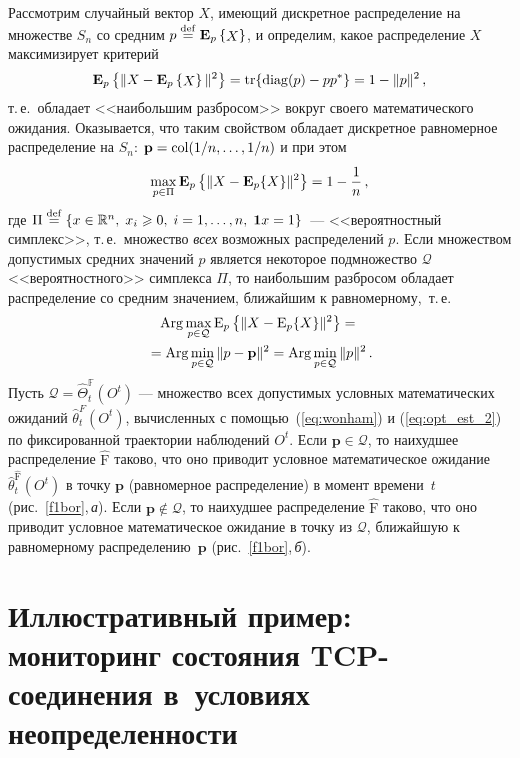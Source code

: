 \begin{multicols}{2}
 Рассмотрим случайный вектор $X$, имеющий дискретное распределение
 на множестве $S_n$ со средним $p \stackrel{\mathrm {def}}{=} \mathbf{E}_{ p }\left\{ \mathop{X} \right\}$, и определим, какое
 распределение $X$ максимизирует критерий
 $$
 \mathbf{E}_{ p }\left\{ \mathop{\|X-\mathbf{E}_{ p }\left\{ \mathop{X} \right\}\|^2} \right\}=\mathrm{tr} \{ \mathop{\mathrm{ diag}} (p) -pp^*\}=1-\|p\|^2\,,
 $$
 т.\,е.\ обладает <<наибольшим разбросом>> вокруг своего математического
 ожидания. Оказывается, что таким свойством обладает дискретное
 равномерное распределение на $S_n$:
 $\mathbf{p}=\mathop{\mathrm{col}}(1/n,\ldots,1/n)$ и при этом
 $$
\max_{p \in
 \Pi}\mathbf{E}_{ p }\left\{ \mathop{\|X-\mathbf{E}_p\{X\}\|^2} \right\}=1-\displaystyle\frac{\displaystyle 1\mathstrut}{\displaystyle n\mathstrut}\,,
 $$
 где $\Pi \stackrel{\mathrm {def}}{=}\{x \in \mathbb{R}^n,\; x_i \geqslant 0,\;i=1,\ldots,n,\;
 \mathbf{1}x=1\}$~--- <<вероятностный симплекс>>, т.\,е.\ множество
 \emph{всех} возможных распределений $p$.
 Если множеством допустимых средних значений $p$ является некоторое
 подмножество $\mathcal{Q}$ <<вероятностного>> симплекса $\Pi$, то наибольшим
 разбросом обладает распределение со средним значением, ближайшим к
 равномерному,~т.\,е.\
 \begin{multline*}
 \displaystyle \mathop{\mathrm {Arg}}\max_{p \in \mathcal{Q}}\mathrm{E}_{p}
\left \{ \| X-\mathrm{E}_{p}\{X\}\|^2\right \}={}\\
{}= \mathop{\mathrm {Arg}}\min_{p \in \mathcal{Q}}\|p-\mathbf{p}\|^2=\mathop{\mathrm {Arg}}\min_{p \in \mathcal{Q}}\|p\|^2\,.
 \end{multline*}
 Пусть $\mathcal{Q}=\widehat{\Theta}^{\mathbb{F}}_t(O^t)$ --- множество всех
 допустимых условных математических ожиданий $\widehat{\theta}^F_t(O^t)$, вычисленных с
 помощью~(\ref{eq:wonham}) и (\ref{eq:opt_est_2}) по фиксированной траектории
 наблюдений $O^t$. 
  Если $\mathbf{p} \in  \mathcal{Q}$, то наихудшее
 распределение $\widehat{\mathrm{F}}$ таково, что оно приводит условное
 математическое ожидание $\widehat{\theta}^{\widehat{\mathrm{F}}}_t(O^t)$
 в точку $\mathbf{p}$ (равномерное распределение) в момент времени~$t$
 (рис.~\ref{f1bor},\,\textit{а}).
%
 Если $\mathbf{p} \notin \mathcal{Q}$, то наихудшее распределение
 $\widehat{\mathrm{F}}$ таково, что оно приводит условное математическое
 ожидание в точку из $\mathcal{Q}$, ближайшую к равномерному
 распределению~$\mathbf{p}$ (рис.~\ref{f1bor},\,\textit{б}).


 \section{Иллюстративный пример: мониторинг состояния TCP-соединения
 в~условиях неопределенности}


\end{multicols}
